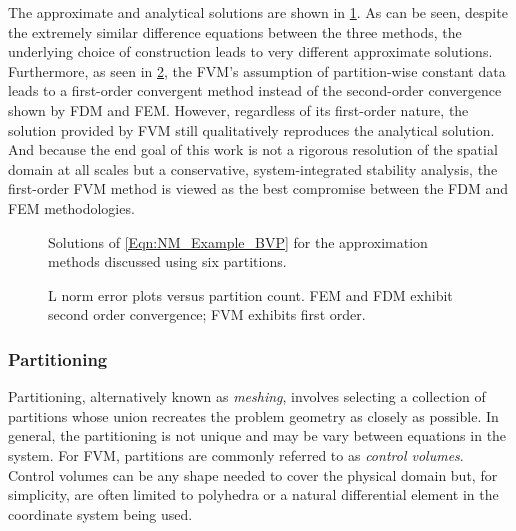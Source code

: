 The approximate and analytical solutions are shown in \cref{Fig:NM_Example_ApproximationComparison}.
As can be seen, despite the extremely similar difference equations between the three methods, the underlying choice of construction leads to very different approximate solutions.
Furthermore, as seen in \cref{Fig:NM_Example_ApproximationComparisonError}, the FVM's assumption of partition-wise constant data leads to a first-order convergent method instead of the second-order convergence shown by FDM and FEM.
However, regardless of its first-order nature, the solution provided by FVM still qualitatively reproduces the analytical solution.
And because the end goal of this work is not a rigorous resolution of the spatial domain at all scales but a conservative, system-integrated stability analysis, the first-order FVM method is viewed as the best compromise between the FDM and FEM methodologies.


\begin{figure}%
    \centering
    \caption{Solutions of \cref{Eqn:NM_Example_BVP} for the approximation methods discussed using six partitions.}
    \label{Fig:NM_Example_ApproximationComparison}
\end{figure}
\begin{figure}%
    \centering
    \caption{L norm error plots versus partition count. FEM and FDM exhibit second order convergence; FVM exhibits first order.}%
    \label{Fig:NM_Example_ApproximationComparisonError}
\end{figure}


\subsubsection{Partitioning}

Partitioning, alternatively known as \textit{meshing}, involves selecting a collection of partitions whose union recreates the problem geometry as closely as possible.
In general, the partitioning is not unique and may be vary between equations in the system.
For FVM, partitions are commonly referred to as \textit{control volumes}.
Control volumes can be any shape needed to cover the physical domain but, for simplicity, are often limited to polyhedra or a natural differential element in the coordinate system being used.

